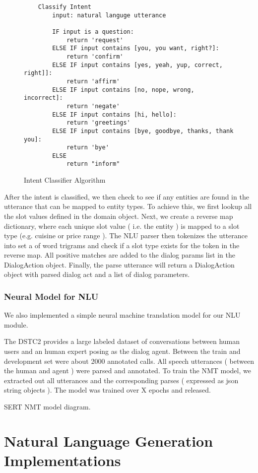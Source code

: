 \begin{figure}[h!]
	\caption{ Intent Classifier Algorithm}
	\label{fig:intent_clf}
	\begin{lstlisting}
	Classify Intent
		input: natural languge utterance
		
		IF input is a question:
			return 'request'
		ELSE IF input contains [you, you want, right?]:
			return 'confirm'
		ELSE IF input contains [yes, yeah, yup, correct, right]]:
			return 'affirm'
		ELSE IF input contains [no, nope, wrong, incorrect]:
			return 'negate'
		ELSE IF input contains [hi, hello]:
			return 'greetings'
		ELSE IF input contains [bye, goodbye, thanks, thank you]:
			return 'bye'
		ELSE
			return "inform"
	\end{lstlisting}
\end{figure}

After the intent is classified, we then check to see if any entities are found in the utterance that can be mapped to entity types. To achieve this, we first lookup all the slot values defined in the domain object. Next, we create a reverse map dictionary, where each unique slot value ( i.e. the entity ) is mapped to a slot type (e.g. cuisine or price range ). The NLU parser then tokenizes the utterance into set a of word trigrams and check if a slot type exists for the token in the reverse map. All positive matches are added to the dialog params list in the DialogAction object. Finally, the parse utterance will return a DialogAction object with parsed dialog act and a list of dialog parameters. 

\subsubsection{Neural Model for NLU}

We also implemented a simple neural machine translation model for our NLU module. 

The DSTC2 provides a large labeled dataset of conversations between human users and an human expert posing as the dialog agent. Between the train and development set were about 2000 annotated calls. All speech utterances ( between the human and agent ) were parsed and annotated. To train the NMT model, we extracted out all utterances and the corresponding parses ( expressed as json string objects ). The model was trained over X epochs and released.

SERT NMT model diagram.



\section{Natural Language Generation Implementations}

